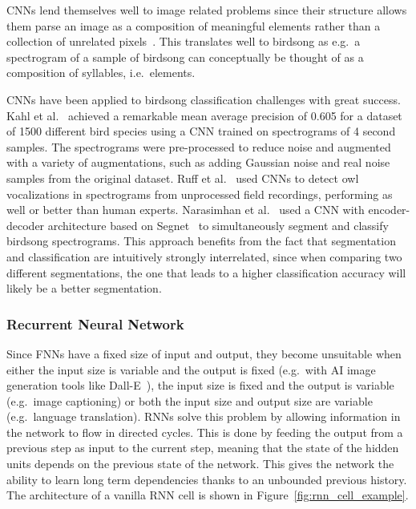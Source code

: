 CNNs lend themselves well to image related problems since their structure
allows them parse an image as a composition of meaningful elements rather than a
collection of unrelated pixels~\cite{lecun2015deep}. This translates well to
birdsong as e.g.\ a spectrogram of a sample of birdsong can conceptually be
thought of as a composition of syllables, i.e.\ elements.

CNNs have been applied to birdsong classification challenges with great success.
Kahl et al.~\cite{kahl2017large} achieved a remarkable mean average precision of
0.605 for a dataset of 1500 different bird species using a CNN trained on
spectrograms of 4 second samples. The spectrograms were pre-processed to reduce
noise and augmented with a variety of augmentations, such as adding Gaussian
noise and real noise samples from the original dataset. Ruff et
al.~\cite{ruff2020automated} used CNNs to detect owl vocalizations in
spectrograms from unprocessed field recordings, performing as well or better
than human experts. Narasimhan et al.~\cite{narasimhan2017simultaneous} used a
CNN with encoder-decoder architecture based on
Segnet~\cite{badrinarayanan2017segnet} to simultaneously segment and classify
birdsong spectrograms. This approach benefits from the fact that segmentation
and classification are intuitively strongly interrelated, since when comparing
two different segmentations, the one that leads to a higher classification
accuracy will likely be a better segmentation.

\subsubsection{Recurrent Neural Network}

Since FNNs have a fixed size of input and output, they become unsuitable when
either the input size is variable and the output is fixed (e.g.\ with AI image
generation tools like Dall-E~\cite{ramesh2021zero}), the input size is fixed and
the output is variable (e.g.\ image captioning) or both the input size and
output size are variable (e.g.\ language translation). RNNs solve this problem
by allowing information in the network to flow in directed cycles. This is done
by feeding the output from a previous step as input to the current step, meaning
that the state of the hidden units depends on the previous state of the network.
This gives the network the ability to learn long term dependencies thanks to an
unbounded previous history. The architecture of a vanilla RNN cell is shown in
Figure~\ref{fig:rnn_cell_example}.

